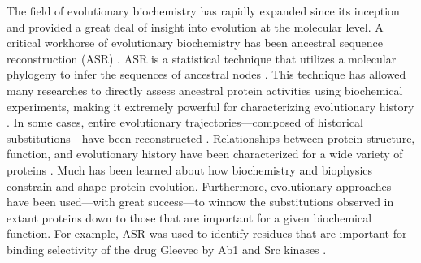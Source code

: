 The field of evolutionary biochemistry has rapidly expanded since
its inception and provided a great deal of insight into evolution
at the molecular level. A critical workhorse of evolutionary biochemistry
has been ancestral sequence reconstruction (ASR) \citep{pauling_chemical_1963,harms_evolutionary_2013,harms_historical_2014,wheeler_thermostability_2016}.
ASR is a statistical technique that utilizes a molecular phylogeny
to infer the sequences of ancestral nodes \citep{liberles_ancestral_2007,hanson-smith_robustness_2010,harms_evolutionary_2013,eick_robustness_2017}.
This technique has allowed many researches to directly assess ancestral
protein activities using biochemical experiments, making it extremely
powerful for characterizing evolutionary history \citep{harms_analyzing_2010,harms_evolutionary_2013,harms_historical_2014,wheeler_thermostability_2016}.
In some cases, entire evolutionary trajectories---composed of historical
substitutions---have been reconstructed \citep{bridgham_epistatic_2009,mckeown_evolution_2014,boucher_atomic-resolution_2014}.
Relationships between protein structure, function, and evolutionary
history have been characterized for a wide variety of proteins \citep{boucher_atomic-resolution_2014,anderson_intermolecular_2015,clifton_ancestral_2016,mckeown_evolution_2014,hart_thermodynamic_2014,harms_historical_2014,aakre_evolving_2015,eick_evolution_2012,wilson_using_2015,risso_hyperstability_2013}.
Much has been learned about how biochemistry and biophysics constrain
and shape protein evolution. Furthermore, evolutionary approaches
have been used---with great success---to winnow the substitutions observed
in extant proteins down to those that are important for a given biochemical
function. For example, ASR was used to identify residues that are
important for binding selectivity of the drug Gleevec by Ab1 and Src
kinases \citep{wilson_using_2015}. 

